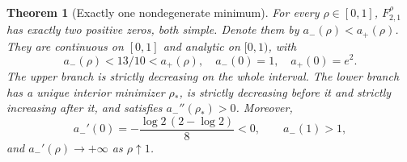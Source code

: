 \documentclass[11pt]{article}
\numberwithin{equation}{section}
\newtheorem{theorem}{Theorem}[section]
\theoremstyle{definition}\newtheorem{definition}[theorem]{Definition}
\theoremstyle{remark}\newtheorem{remark}[theorem]{Remark}
\begin{document}
\begin{theorem}[Exactly one nondegenerate minimum]\label{thm:n2}
For every $\rho\in[0,1]$, $F_{2,1}^{\rho}$ has exactly two positive zeros, both simple. Denote them by $a_-(\rho)<a_+(\rho)$. They are continuous on $[0,1]$ and analytic on $[0,1)$, with
\[
a_-(\rho)<13/10<a_+(\rho),\quad
 a_-(0)=1,\quad a_+(0)=e^2.
\]
The upper branch is strictly decreasing on the whole interval. The lower branch has a unique interior minimizer $\rho_*$, is strictly decreasing before it and strictly increasing after it, and satisfies $a_-''(\rho_*)>0$.
Moreover,
\begin{equation}\label{eq:n2start}
a_-'(0)=-\frac{\log2\,(2-\log2)}8<0,
\qquad a_-(1)>1,
\end{equation}
and $a_-'(\rho)\to+\infty$ as $\rho\uparrow1$.
\end{theorem}
\end{document}
